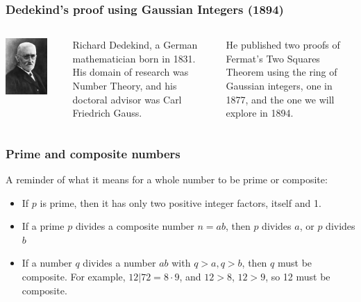 \documentclass{beamer}
\begin{document}
\begin{frame}
	\frametitle{Dedekind's proof using Gaussian Integers (1894)}
	\begin{columns}
		\begin{center}
			\includegraphics[width=0.8\textwidth]{Richard_Dedekind_1900s.jpg}
		\end{center}
		Richard Dedekind, a German mathematician born in 1831.
		His domain of research was Number Theory, and his doctoral advisor was
		Carl Friedrich Gauss.
		
		He published two proofs of Fermat's Two Squares Theorem using the ring of
		Gaussian integers, one in 1877, and the one we will explore in 1894.

	\end{columns}
\end{frame}

\begin{frame}
	\frametitle{Prime and composite numbers}

	A reminder of what it means for a whole number to be prime or composite:
	\begin{itemize}
		\item If $p$ is prime, then it has only two positive integer factors, itself and 1.
		\item If a prime $p$ divides a composite number $n = ab$, then $p$ divides $a$, or $p$ divides $b$
		\item If a number $q$ divides a number $ab$ with $q>a, q>b$, then $q$ must be composite.
			For example, $12 | 72 = 8 \cdot 9$, and $12>8$, $12>9$, so 12 must be composite.
	\end{itemize}
\end{frame}
\end{document}
